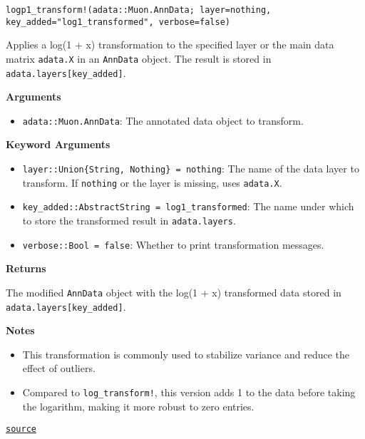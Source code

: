 \documentclass[oneside]{memoir}
\begin{document}
\begin{adjustwidth}{2em}{0pt}


\begin{verbatim}
logp1_transform!(adata::Muon.AnnData; layer=nothing, key_added="log1_transformed", verbose=false)
\end{verbatim}

Applies a log(1 + x) transformation to the specified layer or the main data matrix \texttt{adata.X} in an \texttt{AnnData} object. The result is stored in \texttt{adata.layers[key\_added]}.

\textbf{Arguments}

\begin{itemize}
\item \texttt{adata::Muon.AnnData}: The annotated data object to transform.

\end{itemize}
\textbf{Keyword Arguments}

\begin{itemize}
\item \texttt{layer::Union\{String, Nothing\} = nothing}: The name of the data layer to transform. If \texttt{nothing} or the layer is missing, uses \texttt{adata.X}.


\item \texttt{key\_added::AbstractString = {\textquotedbl}log1\_transformed{\textquotedbl}}: The name under which to store the transformed result in \texttt{adata.layers}.


\item \texttt{verbose::Bool = false}: Whether to print transformation messages.

\end{itemize}
\textbf{Returns}

The modified \texttt{AnnData} object with the log(1 + x) transformed data stored in \texttt{adata.layers[key\_added]}.

\textbf{Notes}

\begin{itemize}
\item This transformation is commonly used to stabilize variance and reduce the effect of outliers.


\item Compared to \texttt{log\_transform!}, this version adds 1 to the data before taking the logarithm, making it more robust to zero entries.

\end{itemize}


\href{https://github.com/zehua0417/Juscan.jl/blob/393ad1b827b678ea98a738f92af658ee9ed9a403/src/tools/pca.jl#L229-L249}{\texttt{source}}


\end{adjustwidth}
\end{document}
